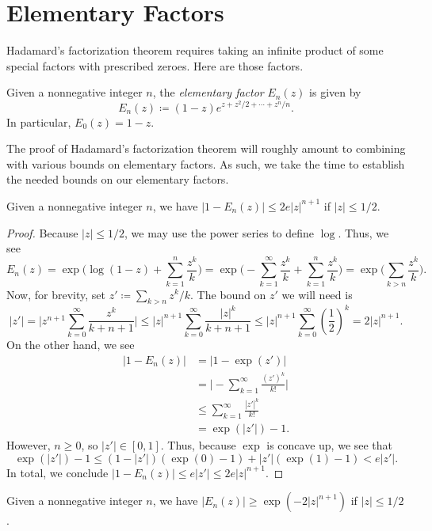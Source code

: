 \documentclass[notes.tex]{subfiles}
\begin{document}
\section{Elementary Factors}
Hadamard's factorization theorem requires taking an infinite product of some special factors with prescribed zeroes. Here are those factors.
\begin{definition}
	Given a nonnegative integer $n$, the \textit{elementary factor} $E_n(z)$ is given by
	\[E_n(z)\coloneqq(1-z)e^{z+z^2/2+\cdots+z^n/n}.\]
	In particular, $E_0(z)=1-z$.
\end{definition}
The proof of Hadamard's factorization theorem will roughly amount to combining  with various bounds on elementary factors. As such, we take the time to establish the needed bounds on our elementary factors.
\begin{lemma} \label{lem:elem-upper-bound}
	Given a nonnegative integer $n$, we have $|1-E_n(z)|\le2e|z|^{n+1}$ if $|z|\le1/2$.
\end{lemma}
\begin{proof}
	Because $|z|\le1/2$, we may use the power series to define $\log$. Thus, we see
	\[E_n(z)=\exp\Bigg(\log(1-z)+\sum_{k=1}^n\frac{z^k}k\Bigg)=\exp\Bigg(-\sum_{k=1}^\infty\frac{z^k}k+\sum_{k=1}^n\frac{z^k}k\Bigg)=\exp\Bigg(\sum_{k>n}\frac{z^k}k\Bigg).\]
	Now, for brevity, set $z'\coloneqq\sum_{k>n}z^k/k$. The bound on $z'$ we will need is
	\[|z'|=\Bigg|z^{n+1}\sum_{k=0}^\infty\frac{z^k}{k+n+1}\Bigg|\le|z|^{n+1}\sum_{k=0}^\infty\frac{|z|^k}{k+n+1}\le|z|^{n+1}\sum_{k=0}^\infty\left(\frac12\right)^k=2|z|^{n+1}.\]
	On the other hand, we see
	\begin{align*}
		|1-E_n(z)| &= |1-\exp(z')| \\
		&= \Bigg|-\sum_{k=1}^\infty\frac{(z')^k}{k!}\Bigg| \\
		&\le \sum_{k=1}^\infty\frac{|z'|^k}{k!} \\
		&= \exp(|z'|)-1.
	\end{align*}
	However, $n\ge0$, so $|z'|\in[0,1]$. Thus, because $\exp$ is concave up, we see that
	\[\exp(|z'|)-1\le(1-|z'|)(\exp(0)-1)+|z'|(\exp(1)-1)<e|z'|.\]
	In total, we conclude $|1-E_n(z)|\le e|z'|\le2e|z|^{n+1}$.
\end{proof}
\begin{lemma} \label{lem:elem-lower-bound-small}
	Given a nonnegative integer $n$, we have $|E_n(z)|\ge\exp\left(-2|z|^{n+1}\right)$ if $|z|\le1/2$.
\end{lemma}
\end{document}
